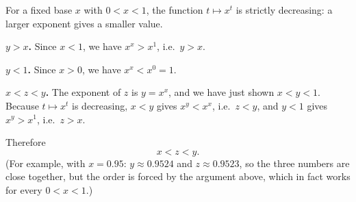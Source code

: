 For a fixed base $x$ with $0<x<1$, the function $t\mapsto x^t$ is strictly decreasing: a larger exponent gives a smaller value.

\textbf{$y>x$.} Since $x<1$, we have $x^x>x^1$, i.e.\ $y>x$.

\textbf{$y<1$.} Since $x>0$, we have $x^x<x^0=1$.

\textbf{$x<z<y$.} The exponent of $z$ is $y=x^x$, and we have just shown $x<y<1$. Because $t\mapsto x^t$ is decreasing, $x<y$ gives $x^y<x^x$, i.e.\ $z<y$, and $y<1$ gives $x^y>x^1$, i.e.\ $z>x$.

Therefore
\[
\boxed{x<z<y}.
\]
(For example, with $x=0.95$: $y\approx0.9524$ and $z\approx0.9523$, so the three numbers are close together, but the order is forced by the argument above, which in fact works for every $0<x<1$.)
